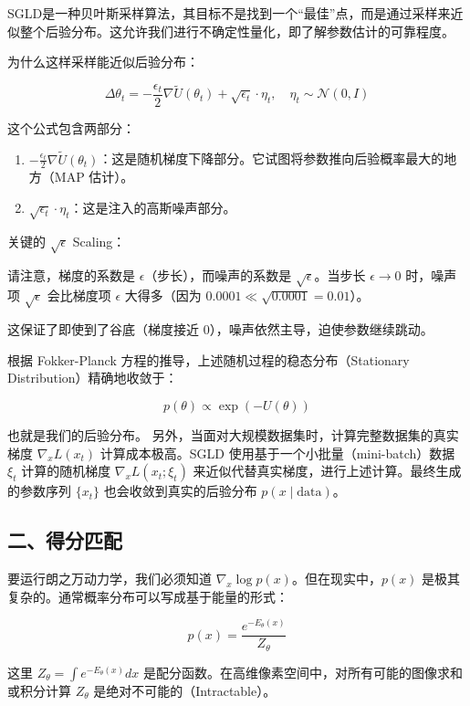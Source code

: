 SGLD是一种贝叶斯采样算法，其目标不是找到一个``最佳''点，而是通过采样来近似整个后验分布。这允许我们进行不确定性量化，即了解参数估计的可靠程度。

为什么这样采样能近似后验分布：

\[
\Delta\theta_t=-\frac{\epsilon_t}{2}\nabla\tilde{U}(\theta_t)+\sqrt{\epsilon_t}\cdot\eta_t,\quad \eta_t\sim\mathcal{N}(0,I)
\]

这个公式包含两部分：

\begin{enumerate}
\def\labelenumi{\arabic{enumi}.}
\tightlist
\item
  \(-\frac{\epsilon_t}{2}\nabla\tilde{U}(\theta_t)\)：这是随机梯度下降部分。它试图将参数推向后验概率最大的地方（MAP 估计）。
\item
  \(\sqrt{\epsilon_t}\cdot\eta_t\)：这是注入的高斯噪声部分。
\end{enumerate}

关键的 \(\sqrt{\epsilon}\) Scaling：

请注意，梯度的系数是 \(\epsilon\)（步长），而噪声的系数是 \(\sqrt{\epsilon}\)。当步长 \(\epsilon\to 0\) 时，噪声项 \(\sqrt{\epsilon}\) 会比梯度项 \(\epsilon\) 大得多（因为 \(0.0001\ll\sqrt{0.0001}=0.01\)）。

这保证了即使到了谷底（梯度接近 0），噪声依然主导，迫使参数继续跳动。

根据 Fokker-Planck 方程的推导，上述随机过程的稳态分布（Stationary Distribution）精确地收敛于：

\[
p(\theta)\propto \exp(-U(\theta))
\]

也就是我们的后验分布。
另外，当面对大规模数据集时，计算完整数据集的真实梯度 \(\nabla_x L(x_t)\) 计算成本极高。SGLD 使用基于一个小批量（mini-batch）数据 \(\xi_t\) 计算的随机梯度 \(\nabla_x L(x_t;\xi_t)\) 来近似代替真实梯度，进行上述计算。最终生成的参数序列 \(\{x_t\}\) 也会收敛到真实的后验分布 \(p(x\mid\mathrm{data})\)。

\hypertarget{ux4e8cux5f97ux5206ux5339ux914d}{%
\subsection{二、得分匹配}\label{ux4e8cux5f97ux5206ux5339ux914d}}

要运行朗之万动力学，我们必须知道 \(\nabla_x\log p(x)\)。但在现实中，\(p(x)\) 是极其复杂的。通常概率分布可以写成基于能量的形式：

\[
p(x)=\frac{e^{-E_\theta(x)}}{Z_\theta}
\]

这里 \(Z_\theta=\int e^{-E_\theta(x)}dx\) 是配分函数。在高维像素空间中，对所有可能的图像求和或积分计算 \(Z_\theta\) 是绝对不可能的（Intractable）。

